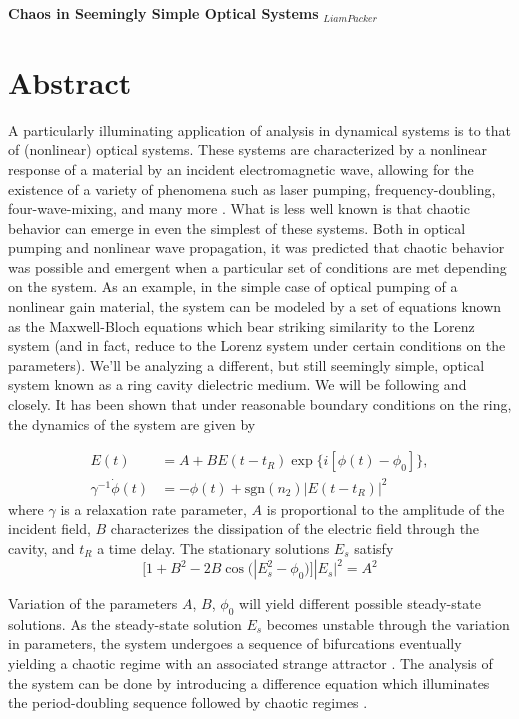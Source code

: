 \documentclass[12pt]{article}
\begin{document}
\centerline{\large {\bf Chaos in Seemingly Simple Optical Systems} $_{Liam Packer}$}

\section*{Abstract}

A particularly illuminating application of analysis in dynamical systems is to that of
(nonlinear) optical systems. These systems are characterized by a nonlinear response of a
material by an incident electromagnetic wave, allowing for the existence of a variety of
phenomena such as laser pumping, frequency-doubling, four-wave-mixing, and many more
\cite{shen_principles_1984}. What is less well known is that chaotic behavior can emerge in
even the simplest of these systems. Both in optical pumping and nonlinear wave propagation,
it was predicted that chaotic behavior was possible and emergent when a particular set of
conditions are met depending on the system. As an example, in the simple case of optical
pumping of a nonlinear gain material, the system can be modeled by a set of equations known
as the Maxwell-Bloch equations \cite{harrison_chaos_1986} which bear striking similarity to
the Lorenz system (and in fact, reduce to the Lorenz system under certain conditions on the
parameters). We'll be analyzing a different, but still seemingly simple, optical system
known as a ring cavity dielectric medium. We will be following
\cite{ikeda_multiple-valued_1979} and \cite{ikeda_optical_1980} closely. It has been shown
\cite{ikeda_multiple-valued_1979} that under reasonable boundary conditions on the ring, the
dynamics of the system are given by

\begin{align*}
  E(t) &= A + BE(t - t_R) \exp\{i[\phi(t) - \phi_0]\},\\
  \gamma^{-1}\dot{\phi}(t) &= -\phi(t) + \text{sgn}(n_2)|E(t - t_R)|^2
\end{align*}
where $\gamma$ is a relaxation rate parameter, $A$ is proportional to the amplitude of the
incident field, $B$ characterizes the dissipation of the electric field through the cavity,
and $t_R$ a time delay. The stationary solutions $E_s$ satisfy
\[[1 + B^2 - 2B\cos(|E_s^2 - \phi_0)]|E_s|^2 = A^2\]

Variation of the parameters $A$, $B$, $\phi_0$ will yield different possible steady-state
solutions. As the steady-state solution $E_s$ becomes unstable through the variation in
parameters, the system undergoes a sequence of bifurcations eventually yielding a chaotic
regime with an associated strange attractor \cite{ikeda_optical_1980}. The analysis of the
system can be done by introducing a difference equation which illuminates the
period-doubling sequence followed by chaotic regimes \cite{harrison_chaos_1986}.
\end{document}
